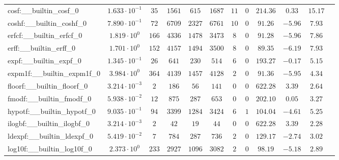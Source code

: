 \begin{tabular}{|l|c|c|c|c|c|c|c|c|c|c|c|}
cosf:\_\_builtin\_cosf\_0                 & $ 1.633 \cdot 10^{-1} $ & $ 35     $ & $ 1561   $ & $ 615   $ & $ 1687   $ & $ 11  $ & $ 0 $ & $ 214.36      $ & $ 0.33    $ & $ 15.17   $ \\
coshf:\_\_builtin\_coshf\_0               & $ 7.890 \cdot 10^{-1} $ & $ 72     $ & $ 6709   $ & $ 2327  $ & $ 6761   $ & $ 10  $ & $ 0 $ & $ 91.26       $ & $ -5.96   $ & $ 7.93    $ \\
erfcf:\_\_builtin\_erfcf\_0               & $ 1.819 \cdot 10^{0}  $ & $ 166    $ & $ 4336   $ & $ 1478  $ & $ 3473   $ & $ 8   $ & $ 0 $ & $ 91.28       $ & $ -5.96   $ & $ 7.86    $ \\
erff:\_\_builtin\_erff\_0                 & $ 1.701 \cdot 10^{0}  $ & $ 152    $ & $ 4157   $ & $ 1494  $ & $ 3500   $ & $ 8   $ & $ 0 $ & $ 89.35       $ & $ -6.19   $ & $ 7.93    $ \\
expf:\_\_builtin\_expf\_0                 & $ 1.345 \cdot 10^{-1} $ & $ 26     $ & $ 641    $ & $ 230   $ & $ 514    $ & $ 6   $ & $ 0 $ & $ 193.27      $ & $ -0.17   $ & $ 5.15    $ \\
expm1f:\_\_builtin\_expm1f\_0             & $ 3.984 \cdot 10^{0}  $ & $ 364    $ & $ 4139   $ & $ 1457  $ & $ 4128   $ & $ 2   $ & $ 0 $ & $ 91.36       $ & $ -5.95   $ & $ 4.34    $ \\
floorf:\_\_builtin\_floorf\_0             & $ 3.214 \cdot 10^{-3} $ & $ 2      $ & $ 186    $ & $ 56    $ & $ 141    $ & $ 0   $ & $ 0 $ & $ 622.28      $ & $ 3.39    $ & $ 2.64    $ \\
fmodf:\_\_builtin\_fmodf\_0               & $ 5.938 \cdot 10^{-2} $ & $ 12     $ & $ 875    $ & $ 287   $ & $ 653    $ & $ 0   $ & $ 0 $ & $ 202.10      $ & $ 0.05    $ & $ 3.27    $ \\
hypotf:\_\_builtin\_hypotf\_0             & $ 9.035 \cdot 10^{-1} $ & $ 94     $ & $ 3399   $ & $ 1284  $ & $ 3424   $ & $ 6   $ & $ 1 $ & $ 104.04      $ & $ -4.61   $ & $ 5.25    $ \\
ilogbf:\_\_builtin\_ilogbf\_0             & $ 3.214 \cdot 10^{-3} $ & $ 2      $ & $ 42     $ & $ 19    $ & $ 44     $ & $ 0   $ & $ 0 $ & $ 622.28      $ & $ 3.39    $ & $ 2.28    $ \\
ldexpf:\_\_builtin\_ldexpf\_0             & $ 5.419 \cdot 10^{-2} $ & $ 7      $ & $ 784    $ & $ 287   $ & $ 736    $ & $ 2   $ & $ 0 $ & $ 129.17      $ & $ -2.74   $ & $ 3.02    $ \\
log10f:\_\_builtin\_log10f\_0             & $ 2.373 \cdot 10^{0}  $ & $ 233    $ & $ 2927   $ & $ 1096  $ & $ 3082   $ & $ 2   $ & $ 0 $ & $ 98.19       $ & $ -5.18   $ & $ 2.89    $ \\

\end{tabular}
